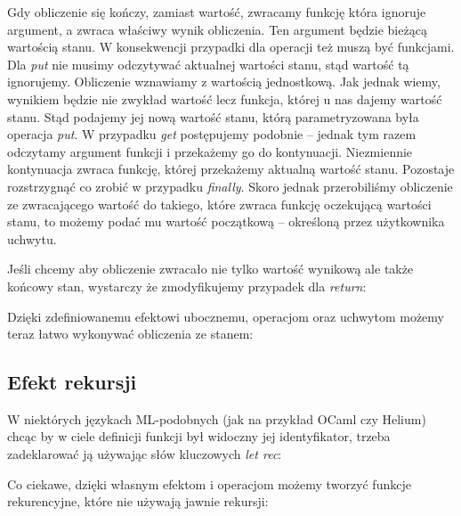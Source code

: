 

Gdy obliczenie się kończy, zamiast wartość, zwracamy funkcję która ignoruje argument, a zwraca właściwy wynik obliczenia. Ten argument będzie bieżącą wartością stanu. W konsekwencji przypadki dla operacji też muszą być funkcjami. Dla \textit{put} nie musimy odczytywać aktualnej wartości stanu, stąd wartość tą ignorujemy. Obliczenie wznawiamy z wartością jednostkową. Jak jednak wiemy, wynikiem będzie nie zwykład wartość lecz funkcja, której u nas dajemy wartość stanu. Stąd podajemy jej nową wartość stanu, którą parametryzowana była operacja \textit{put}. W przypadku \textit{get} postępujemy podobnie -- jednak tym razem odczytamy argument funkcji i przekażemy go do kontynuacji. Niezmiennie kontynuacja zwraca funkcję, której przekażemy aktualną wartość stanu. Pozostaje rozstrzygnąć co zrobić w przypadku \textit{finally}. Skoro jednak przerobiliśmy obliczenie ze zwracającego wartość do takiego, które zwraca funkcję oczekującą wartości stanu, to możemy podać mu wartość początkową -- określoną przez użytkownika uchwytu.

Jeśli chcemy aby obliczenie zwracało nie tylko wartość wynikową ale także końcowy stan, wystarczy że zmodyfikujemy przypadek dla \textit{return}:



Dzięki zdefiniowanemu efektowi ubocznemu, operacjom oraz uchwytom możemy teraz łatwo wykonywać obliczenia ze stanem:



\subsection{Efekt rekursji}

W niektórych językach ML-podobnych (jak na przykład OCaml czy Helium) chcąc by w ciele definicji funkcji był widoczny jej identyfikator, trzeba zadeklarować ją używając słów kluczowych \textit{let rec}:



Co ciekawe, dzięki własnym efektom i operacjom możemy tworzyć funkcje rekurencyjne, które nie używają jawnie rekursji:




